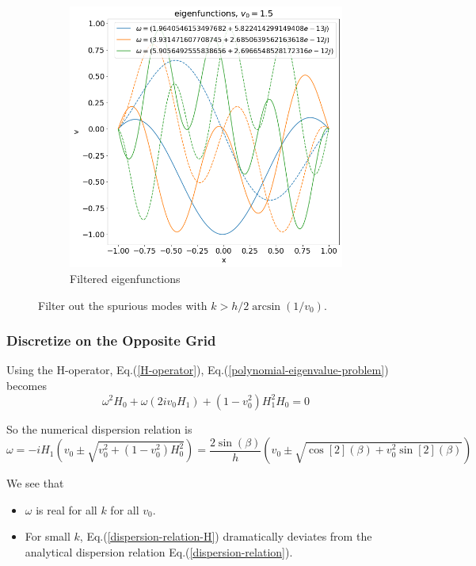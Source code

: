 \begin{figure}[H]
\begin{subfigure}[b]{0.5\linewidth}
		\includegraphics[width=\linewidth]{img/spectral_theory/eigfuncs_G_filtered.png} 
		\caption{Filtered eigenfunctions}
		\label{fig:results-G-b}
	\end{subfigure}
	\caption{Filter out the spurious modes with $k>h/2\arcsin(1/v_0)$.}
	\label{fig:results-G}
\end{figure}

\subsubsection{Discretize on the Opposite Grid}
Using the H-operator, Eq.(\ref{H-operator}), Eq.(\ref{polynomial-eigenvalue-problem}) becomes
\[ \omega^2H_0 + \omega(2iv_0H_1) + (1-v_0^2)H_1^2H_0 = 0 \]

So the numerical dispersion relation is
\begin{equation}\label{dispersion-relation-H}
	\omega = -iH_1 \left(v_0 \pm \sqrt{v_0^2 + (1-v_0^2)H_0^2}\right) = \frac{2\sin(\beta)}{h}\left(v_0 \pm \sqrt{\cos[2](\beta) + v_0^2\sin[2](\beta)}\right)
\end{equation}

We see that 
\begin{itemize}
	\item $\omega$ is real for all $k$ for all $v_0$.
	\item For small $k$, Eq.(\ref{dispersion-relation-H}) dramatically deviates from the analytical dispersion relation Eq.(\ref{dispersion-relation}). 
\end{itemize}

